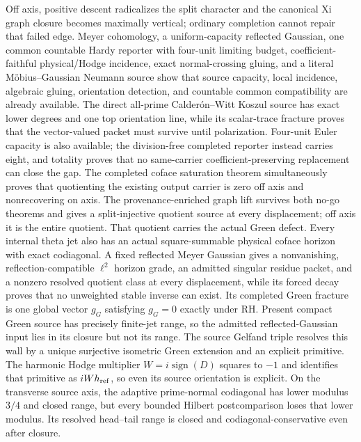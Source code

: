 \documentclass[11pt]{article}
\theoremstyle{definition}
\theoremstyle{remark}
\begin{document}
Off axis, positive descent radicalizes the split character and the canonical
Xi graph closure becomes maximally vertical; ordinary completion cannot
repair that failed edge.  Meyer cohomology, a uniform-capacity reflected
Gaussian, one common countable Hardy reporter with four-unit limiting
budget, coefficient-faithful
physical/Hodge incidence, exact normal-crossing gluing, and a literal
M\"obius--Gaussian Neumann source show that source capacity, local
incidence, algebraic gluing, orientation detection, and countable common
compatibility are already available.  The direct all-prime
Calder\'on--Witt Koszul source has exact lower degrees and one top orientation
line, while its scalar-trace fracture proves that the vector-valued packet
must survive until polarization.  Four-unit Euler capacity is also
available; the division-free completed reporter instead carries eight, and
totality proves that no same-carrier coefficient-preserving replacement can
close the gap.  The completed coface saturation theorem simultaneously
proves that quotienting the existing output carrier is zero off axis and
nonrecovering on axis.  The provenance-enriched graph lift survives both
no-go theorems and gives a split-injective quotient source at every
displacement; off axis it is the entire quotient.  That quotient carries the
actual Green defect.  Every
internal theta jet also has an actual square-summable physical coface
horizon with exact codiagonal.  A fixed reflected Meyer Gaussian gives a
nonvanishing, reflection-compatible
\(\ell^2\) horizon grade, an admitted singular residue packet, and a nonzero
resolved quotient class at every displacement, while its forced decay proves
that no unweighted stable inverse can exist.  Its completed Green fracture
is one global vector \(g_G\) satisfying \(g_G=0\) exactly under RH.  Present
compact Green source has precisely finite-jet range, so the admitted
reflected-Gaussian input lies in its closure but not its range.  The source
Gelfand triple resolves this wall by a unique surjective isometric Green
extension and an explicit primitive.  The harmonic Hodge multiplier
\(W=i\operatorname{sign}(D)\) squares to \(-1\) and identifies that primitive
as \(iWh_{\rm ref}\), so even its source orientation is explicit.  On the
transverse source axis, the adaptive prime-normal codiagonal has lower
modulus \(3/4\) and closed range, but every bounded Hilbert postcomparison
loses that lower modulus.  Its resolved head--tail range is closed and
codiagonal-conservative even after closure.
\end{document}
